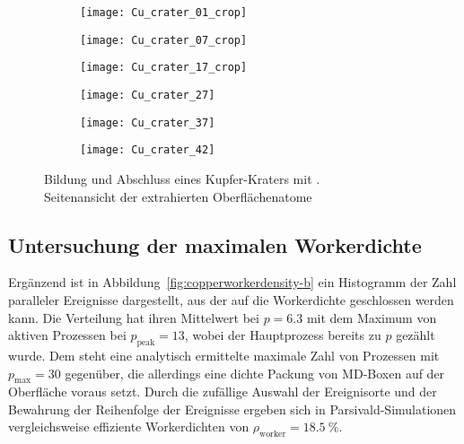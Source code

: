 \begin{figure}

  \captionsetup[subfigure]{justification=centering,singlelinecheck=false}
  \def\subfigwidth{0.32\textwidth}

  \begin{subfigure}[t]{\subfigwidth}
    \texttt{[image: Cu\_crater\_01\_crop]}
  \end{subfigure}
  \hfill
  \begin{subfigure}[t]{\subfigwidth}
    \texttt{[image: Cu\_crater\_07\_crop]}
  \end{subfigure}
  \hfill
  \begin{subfigure}[t]{\subfigwidth}
    \texttt{[image: Cu\_crater\_17\_crop]}
  \end{subfigure}

  \begin{subfigure}[t]{\subfigwidth}
    \texttt{[image: Cu\_crater\_27]}
  \end{subfigure}
  \hfill
  \begin{subfigure}[t]{\subfigwidth}
    \texttt{[image: Cu\_crater\_37]}
  \end{subfigure}
  \hfill
  \begin{subfigure}[t]{\subfigwidth}
    \texttt{[image: Cu\_crater\_42]}
  \end{subfigure}

  \caption[Bildung und Abschluss eines Kupfer-Kraters]{
    Bildung und Abschluss eines Kupfer-Kraters mit .\\
    Seitenansicht der extrahierten Oberflächenatome
  }
  \label{fig:coppercrater}
\end{figure}

\subsection{Untersuchung der maximalen Workerdichte}

Ergänzend ist in Abbildung~\ref{fig:copperworkerdensity-b} ein Histogramm der Zahl paralleler Ereignisse dargestellt, aus der auf die Workerdichte geschlossen werden kann.
Die Verteilung hat ihren Mittelwert bei $p = \num{6.3}$ mit dem Maximum von aktiven Prozessen bei $p_\text{peak} = \num{13}$, wobei der Hauptprozess bereits zu $p$ gezählt wurde.
Dem steht eine analytisch ermittelte maximale Zahl von Prozessen mit $p_\text{max} = \num{30}$ gegenüber, die allerdings eine dichte Packung von MD-Boxen auf der Oberfläche voraus setzt.
Durch die zufällige Auswahl der Ereignisorte und der Bewahrung der Reihenfolge der Ereignisse ergeben sich in Parsivald-Simulationen vergleichsweise effiziente Workerdichten von $\rho_\text{worker} = \SI{18.5}{\percent}$.

